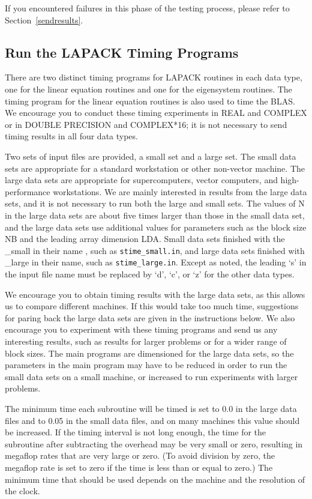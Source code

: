 \documentclass[11pt]{report}
\begin{document}
If you encountered failures in this phase of the testing process, please
refer to Section~\ref{sendresults}.

\subsection{Run the LAPACK Timing Programs}

There are two distinct timing programs for LAPACK routines
in each data type, one for the linear equation routines and
one for the eigensystem routines.  The timing program for the
linear equation routines is also used to time the BLAS.
We encourage you to conduct these timing experiments
in REAL and COMPLEX or in DOUBLE PRECISION and COMPLEX*16; it is
not necessary to send timing results in all four data types.

Two sets of input files are provided, a small set and a large set.
The small data sets are appropriate for a standard workstation or
other non-vector machine.
The large data sets are appropriate for supercomputers, vector
computers, and high-performance workstations.
We are mainly interested in results from the large data sets, and
it is not necessary to run both the large and small sets.
The values of N in the large data sets are about five times larger
than those in the small data set,
and the large data sets use additional values for parameters such as the
block size NB and the leading array dimension LDA.
Small data sets finished with the \_small in their name , such as
\texttt{stime\_small.in}, and large data sets finished with \_large in their name,
such as \texttt{stime\_large.in}.
Except as noted, the leading `s' in the input file name must be
replaced by `d', `c', or `z' for the other data types.

We encourage you to obtain timing results with the large data sets,
as this allows us to compare different machines.
If this would take too much time, suggestions for paring back the large
data sets are given in the instructions below.
We also encourage you to experiment with these timing
programs and send us any interesting results, such as results for
larger problems or for a wider range of block sizes.
The main programs are dimensioned for the large data sets,
so the parameters in the main program may have to be reduced in order
to run the small data sets on a small machine, or increased to run
experiments with larger problems.

The minimum time each subroutine will be timed is set to 0.0 in
the large data files and to 0.05 in the small data files, and on
many machines this value should be increased.
If the timing interval is not long
enough, the time for the subroutine after subtracting the overhead
may be very small or zero, resulting in megaflop rates that are
very large or zero. (To avoid division by zero, the megaflop rate is
set to zero if the time is less than or equal to zero.)
The minimum time that should be used depends on the machine and the
resolution of the clock.
\end{document}
